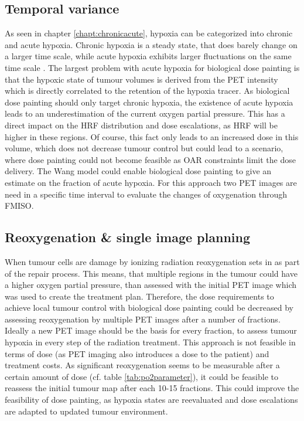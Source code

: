 \subsection{Temporal variance}
As seen in chapter \ref{chapt:chronicacute}, hypoxia can be categorized into chronic and acute hypoxia. Chronic hypoxia is a steady state, that does barely change on a larger time scale, while acute hypoxia exhibits larger fluctuations on the same time scale \cite{pmid9783887, pmid18086391,pmid19203843, pmid15234030, pmid17543402, pmid16098619, pmid17674980, pmid18313529}. The largest problem with acute hypoxia for biological dose painting is that the hypoxic state of tumour volumes is derived from the PET intensity which is directly correlated to the retention of the hypoxia tracer. As biological dose painting should only target chronic hypoxia, the existence of acute hypoxia leads to an underestimation of the current oxygen partial pressure. This has a direct impact on the HRF distribution and dose escalations, as HRF will be higher in these regions. Of course, this fact only leads to an increased dose in this volume, which does not decrease tumour control but could lead to a scenario, where dose painting could not become feasible as OAR constraints limit the dose delivery. The Wang model \cite{pmid19928070} could enable biological dose painting to give an estimate on the fraction of acute hypoxia. For this approach two PET images are need in a specific time interval to evaluate the changes of oxygenation through FMISO.
\subsection{Reoxygenation \& single image planning}
When tumour cells are damage by ionizing radiation reoxygenation sets in as part of the repair process. This means, that multiple regions in the tumour could have a higher oxygen partial pressure, than assessed with the initial PET image which was used to create the treatment plan. Therefore, the dose requirements to achieve local tumour control with biological dose painting could be decreased by assessing reoxygenation by multiple PET images after a number of fractions. Ideally a new PET image should be the basis for every fraction, to assess tumour hypoxia in every step of the radiation treatment. This approach is not feasible in terms of dose (as PET imaging also introduces a dose to the patient) and treatment costs. As significant reoxygenation seems to be measurable after a certain amount of dose (cf. table \ref{tab:po2parameter}), it could be feasible to reassess the initial tumour map after each 10-15 fractions. This could improve the feasibility of dose painting, as hypoxia states are reevaluated and dose escalations are adapted to updated tumour environment. 
